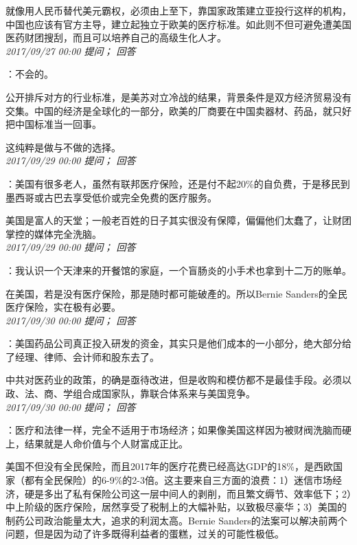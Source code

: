\documentclass[twocolumn]{ctexart}
\begin{document}
就像用人民币替代美元霸权，必须由上至下，靠国家政策建立亚投行这样的机构，中国也应该有官方主导，建立起独立于欧美的医疗标准。如此则不但可避免遭美国医药财团搜刮，而且可以培养自己的高级生化人才。\\

\textit{\hfill\noindent\small 2017/09/27 00:00 提问； 回答}

：不会的。

公开排斥对方的行业标准，是美苏对立冷战的结果，背景条件是双方经济贸易没有交集。中国的经济是全球化的一部分，欧美的厂商要在中国卖器材、药品，就只好把中国标准当一回事。

这纯粹是做与不做的选择。\\

\textit{\hfill\noindent\small 2017/09/29 00:00 提问； 回答}

：美国有很多老人，虽然有联邦医疗保险，还是付不起20\%的自负费，于是移民到墨西哥或古巴去享受低价或完全免费的医疗服务。

美国是富人的天堂；一般老百姓的日子其实很没有保障，偏偏他们太蠢了，让财团掌控的媒体完全洗脑。\\

\textit{\hfill\noindent\small 2017/09/29 00:00 提问； 回答}

：我认识一个天津来的开餐馆的家庭，一个盲肠炎的小手术也拿到十二万的账单。

在美国，若是没有医疗保险，那是随时都可能破產的。所以Bernie Sanders的全民医疗保险，实在极有必要。\\

\textit{\hfill\noindent\small 2017/09/30 00:00 提问； 回答}

：美国药品公司真正投入研发的资金，其实只是他们成本的一小部分，绝大部分给了经理、律师、会计师和股东去了。

中共对医药业的政策，的确是亟待改进，但是收购和模仿都不是最佳手段。必须以政、法、商、学组合成国家队，靠联合体系来与美国竞争。\\

\textit{\hfill\noindent\small 2017/09/30 00:00 提问； 回答}

：医疗和法律一样，完全不适用于市场经济；如果像美国这样因为被财阀洗脑而硬上，结果就是人命价值与个人财富成正比。

美国不但没有全民保险，而且2017年的医疗花费已经高达GDP的18\%，是西欧国家（都有全民保险）的6-9\%的2-3倍。这主要来自三方面的浪费：1）迷信市场经济，硬是多出了私有保险公司这一层中间人的剥削，而且繁文缛节、效率低下；2）中上阶级的医疗保险，居然享受了税制上的大幅补贴，以致极尽豪华；3）美国的制药公司政治能量太大，追求的利润太高。Bernie Sanders的法案可以解决前两个问题，但是因为动了许多既得利益者的蛋糕，过关的可能性极低。
\end{document}
